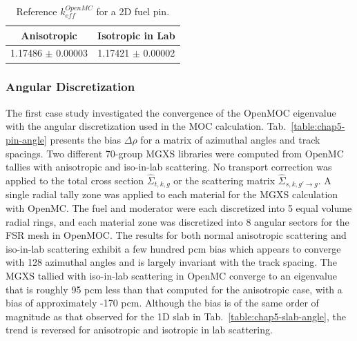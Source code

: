 \begin{table}[h!]
  \centering
  \caption[Reference $k^{OpenMC}_{eff}$ for a 2D fuel pin]{Reference $k^{OpenMC}_{eff}$ for a 2D fuel pin.}
  \label{table:chap5-pin-reference} 
  \vspace{6pt}
  \begin{tabular}{c c}
  \toprule
  \rowcolor{lightgray}
  {\cellcolor{carolinablue} {\bf Anisotropic}} &
  {\cellcolor{lightgreen} {\bf Isotropic in Lab}} \\
  \midrule
  1.17486 $\pm$ 0.00003 & 1.17421 $\pm$ 0.00002 \\
  \bottomrule
\end{tabular}
\end{table}

\subsubsection{Angular Discretization}
\label{subsubsec:chap5-pin-angle}

The first case study investigated the convergence of the OpenMOC eigenvalue with the angular discretization used in the \ac{MOC} calculation. Tab.~\ref{table:chap5-pin-angle} presents the bias $\Delta\rho$ for a matrix of azimuthal angles and track spacings. Two different 70-group \ac{MGXS} libraries were computed from OpenMC tallies with anisotropic and iso-in-lab scattering. No transport correction was applied to the total cross section $\hat{\Sigma}_{t,k,g}$ or the scattering matrix $\hat{\Sigma}_{s,k,g'\rightarrow g}$. A single radial tally zone was applied to each material for the \ac{MGXS} calculation with OpenMC. The fuel and moderator were each discretized into 5 equal volume radial rings, and each material zone was discretized into 8 angular sectors for the \ac{FSR} mesh in OpenMOC. The results for both normal anisotropic scattering and iso-in-lab scattering exhibit a few hundred \ac{pcm} bias which appears to converge with 128 azimuthal angles and is largely invariant with the track spacing. The \ac{MGXS} tallied with iso-in-lab scattering in OpenMC converge to an eigenvalue that is roughly 95 \ac{pcm} less than that computed for the anisotropic case, with a bias of approximately -170 pcm. Although the bias is of the same order of magnitude as that observed for the 1D slab in Tab.~\ref{table:chap5-slab-angle}, the trend is reversed for anisotropic and isotropic in lab scattering.

